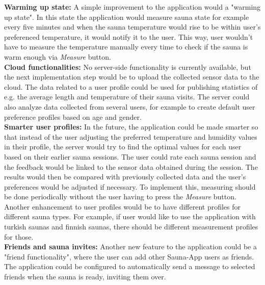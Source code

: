 \documentclass[11pt]{article}
\begin{document}
\noindent\textbf{Warming up state:} A simple improvement to the application would a "warming up state". In this state the application would measure sauna state for example every five minutes and when the sauna temperature would rise to be within user's preferenced temperature, it would notify it to the user. This way, user wouldn't have to measure the temperature manually every time to check if the sauna is warm enough via \textit{Measure} button. \\

\noindent\textbf{Cloud functionalities:} No server-side functionality is currently available, but the next implementation step would be to upload the collected sensor data to the cloud. The data related to a user profile could be used for publishing statistics of e.g. the average length and temperature of their sauna visits. The server could also analyze data collected from several users, for example to create default user preference profiles based on age and gender. \\

\noindent\textbf{Smarter user profiles:} In the future, the application could be made smarter so that instead of the user adjusting the preferred temperature and humidity values in their profile, the server would try to find the optimal values for each user based on their earlier sauna sessions. The user could rate each sauna session and the feedback would be linked to the sensor data obtained during the session. The results would then be compared with previously collected data and the user's preferences would be adjusted if necessary. To implement this, measuring should be done periodically without the user having to press the \textit{Measure} button. Another enhancement to user profiles would be to have different profiles for different sauna types. For example, if user would like to use the application with turkish saunas and finnish saunas, there should be different measurement profiles for those. \\

\noindent\textbf{Friends and sauna invites:} Another new feature to the application could be a "friend functionality", where the user can add other Sauna-App users as friends. The application could be configured to automatically send a message to selected friends when the sauna is ready, inviting them over. \\
\end{document}
